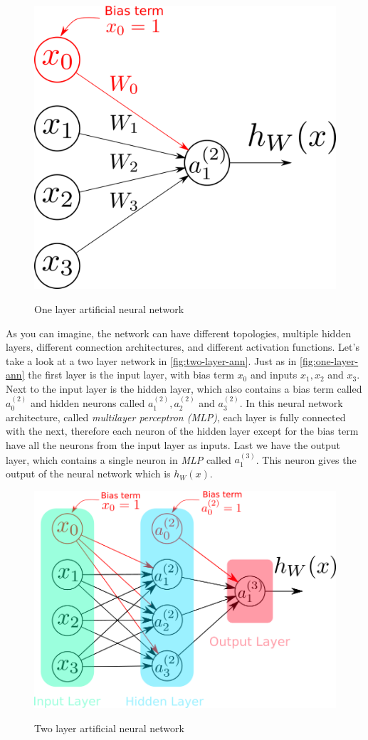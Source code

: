 \begin{figure}[bth]
  \myfloatalign
  {\includegraphics[width=.6\linewidth]
    {gfx/simple-ann-model}}
  \caption{One layer artificial neural network}
  \label{fig:one-layer-ann}
\end{figure}

As you can imagine, the network can have different topologies,
multiple hidden layers, different connection architectures, and
different activation functions. Let's take a look at a two layer
network in \autoref{fig:two-layer-ann}. Just as in
\autoref{fig:one-layer-ann} the first layer is the input layer, with
bias term $x_0$ and inputs $x_1, x_2$ and $x_3$. Next to the input
layer is the hidden layer, which also contains a bias term called
$a_0^{(2)}$ and hidden neurons called $a_1^{(2)}, a_2^{(2)}$ and
$a_3^{(2)}$. In this neural network architecture, called
\textit{multilayer perceptron (MLP)}, each layer is fully connected
with the next, therefore each neuron of the hidden layer except for
the bias term have all the neurons from the input layer as inputs.
Last we have the output layer, which contains a single neuron in
\textit{MLP} called $a_1^{(3)}$. This neuron gives the output of the
neural network which is $h_{W}(x)$.

\begin{figure}[bth]
  \myfloatalign
  {\includegraphics[width=1\linewidth]
    {gfx/two-layer-ann-model}}
  \caption{Two layer artificial neural network}
  \label{fig:two-layer-ann}
\end{figure}


